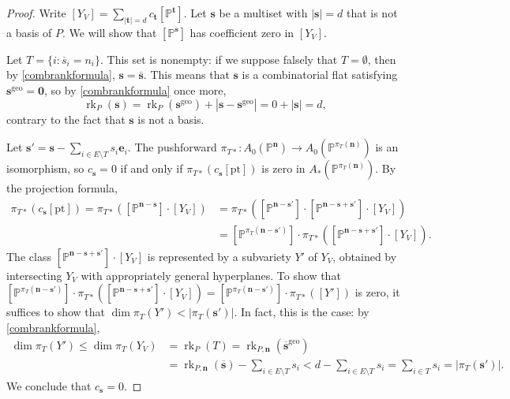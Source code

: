 \documentclass[11pt]{article}
\theoremstyle{definition}
\numberwithin{equation}{section}
\renewcommand{\P}{\mathbb{P}}
\newcommand{\geo}{\mathrm{geo}}
\newcommand{\pt}{\mathrm{pt}}
\DeclareMathOperator{\rk}{rk}
\newcommand{\revision}[1]{{#1}}
\begin{document}
\begin{proof}
  Write $[Y_V] =\sum_{|\mathbf t| = d} c_{\mathbf t} [\P^{\mathbf t}]$.
  Let $\mathbf s$ be a multiset with $|\mathbf s| = d$ that is not a basis of $P$. We will show that $[\P^{\mathbf s}]$ has coefficient zero in $[Y_V]$.

  Let $T = \{i : \overline s_i = n_i\}$. This set is nonempty: if we suppose falsely that $T = \emptyset$, then by \cref{combrankformula}, $\mathbf s = \overline{\mathbf s}$. \revision{This means that $\mathbf s$ is a combinatorial flat satisfying $\mathbf s^\geo = \mathbf 0$, so by \cref{combrankformula} once more,
  \[ \rk_P(\mathbf s) = \rk_P(\mathbf s^\geo) + |\mathbf s - \mathbf s^\geo| = 0 + |\mathbf s| = d, \]
  contrary to the fact that $\mathbf s$ is not a basis.}

\revision{Let $\mathbf s' = \mathbf s - \sum_{i \in E \setminus T} s_i \mathbf e_i$.
The pushforward $\pi_{T*}: A_0(\P^{\mathbf n}) \to A_0(\P^{\pi_T(\mathbf n)})$ is an isomorphism, so $c_{\mathbf s} = 0$ if and only if $\pi_{T*}(c_{\mathbf s}[\pt])$ is zero in $A_*(\P^{\pi_T(\mathbf n)})$.
By the projection formula,
\begin{align*}
  \pi_{T*}(c_{\mathbf s}[\pt]) = \pi_{T*}([\P^{\mathbf n - \mathbf s}]  \cdot [Y_V]) &= \pi_{T*}([\P^{\mathbf n - \mathbf s'}] \cdot [\P^{\mathbf n - \mathbf s + \mathbf s'}] \cdot [Y_V])\\
  &= [\P^{\pi_T(\mathbf n - \mathbf s')}] \cdot \pi_{T*}([\P^{\mathbf n - \mathbf s + \mathbf s'}] \cdot [Y_V]).
\end{align*}
The class $[\P^{\mathbf n-\mathbf s + \mathbf s'}] \cdot [Y_V]$ is represented by a subvariety $Y'$ of $Y_V$, obtained by intersecting $Y_V$ with appropriately general hyperplanes.
To show that $[\P^{\pi_T(\mathbf n - \mathbf s')}] \cdot \pi_{T*}([\P^{\mathbf n - \mathbf s + \mathbf s'}] \cdot [Y_V]) = [\P^{\pi_T(\mathbf n - \mathbf s')}] \cdot \pi_{T*}([Y'])$ is zero, it suffices to show that $\dim \pi_T(Y') < |\pi_T(\mathbf s')|$.
   In fact, this is the case: by \cref{combrankformula},
  \begin{align*}
    \dim \pi_T(Y') \leq \dim \pi_T(Y_V) &= \rk_P(T) = \rk_{P, \mathbf n}(\overline{\mathbf s}^\geo) \\
                                                    &= \rk_{P, \mathbf n}(\overline{\mathbf s}) - \sum_{i \in E \setminus T} s_i < d - \sum_{i \in E \setminus T} s_i= \sum_{i \in T} s_i = |\pi_T(\mathbf s')|.
  \end{align*}
  We conclude that $c_{\mathbf s} = 0$.}
\end{proof}
\end{document}

